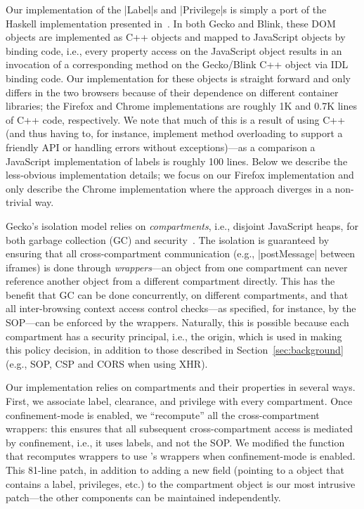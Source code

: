 %
Our implementation of the \js|Label|s and \js|Privilege|s is simply a port
of the Haskell implementation presented
in~\cite{stefan:2011:dclabels,stefan:2011:flexible}. 
%
In both Gecko and Blink, these DOM objects are implemented as C++ objects and
mapped to JavaScript objects by binding code, i.e., every property access on
the JavaScript object results in an invocation of a corresponding method on the
Gecko/Blink C++ object via IDL binding code.
%
Our implementation for these objects  is straight forward and only differs in
the two browsers because of their dependence on different container libraries;
the Firefox and Chrome implementations are roughly 1K and 0.7K lines of C++
code, respectively.
%
We note that much of this is a result of using C++ (and thus having
to, for instance, implement method overloading to support a friendly
API or handling errors without exceptions)---as a comparison a
JavaScript implementation of labels is roughly 100 lines.
%
Below we describe the less-obvious implementation details; we focus on our
Firefox implementation and only describe the Chrome implementation where the
approach diverges in a non-trivial way.
%


Gecko's isolation model relies on \emph{compartments}, i.e., disjoint
JavaScript heaps, for both garbage collection (GC) and
security~\cite{wagner2011compartmental}.
%
The isolation is guaranteed by ensuring that all cross-compartment
communication (e.g., \js|postMessage| between iframes) is done through
\emph{wrappers}---an object from one compartment can never reference
another object from a different compartment directly.
%
This has the benefit that GC can be done concurrently, on different compartments,
and that all inter-browsing context access control checks---as specified, for
instance, by the SOP---can be enforced by the wrappers.
%
Naturally, this is possible because each compartment has a security
principal, i.e., the origin, which is used in making this policy
decision, in addition to those described in
Section~\ref{sec:background} (e.g., SOP, CSP and CORS when using XHR).

Our implementation relies on compartments and their properties in
several ways.
%
First, we associate label, clearance, and privilege with every 
compartment.
%
Once confinement-mode is enabled, we ``recompute'' all the
cross-compartment wrappers: this ensures that all subsequent
cross-compartment access is mediated by confinement, i.e., it uses
labels, and not the SOP. %
%
We modified the function that recomputes wrappers to use \sys{}'s
wrappers when confinement-mode is enabled.
%
This 81-line patch, in addition to adding a new field (pointing to a \sys{}
object that contains a label, privileges, etc.) to the compartment
object is our most intrusive patch---the other \sys{} components can be
maintained independently.

